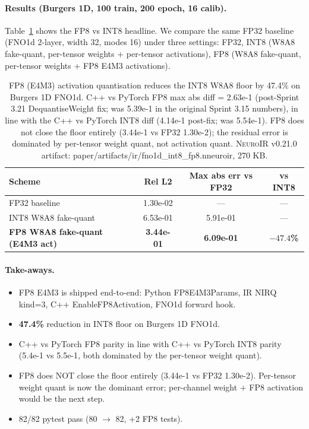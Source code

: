 \documentclass[10pt,twocolumn]{article}
\renewcommand{\texttt}[1]{{\normalfont\ttfamily #1}\normalfont\rmfamily}
\newcommand{\neuroir}{\textsc{NeuroIR}}
\begin{document}
\paragraph{Results (Burgers 1D, 100 train, 200 epoch, 16 calib).}
Table~\ref{tab:fp8-vs-int8} shows the FP8 vs INT8
headline.  We compare the same FP32 baseline
(FNO1d 2-layer, width 32, modes 16) under three
settings: FP32, INT8 (W8A8 fake-quant, per-tensor
weights + per-tensor activations), FP8 (W8A8
fake-quant, per-tensor weights + FP8 E4M3
activations).

\begin{table}[h]
\centering
\begin{tabular}{lccc}
\hline
\textbf{Scheme} & \textbf{Rel L2} & \textbf{Max abs err vs FP32} & \textbf{vs INT8} \\
\hline
FP32 baseline & 1.30e-02 & --- & --- \\
INT8 W8A8 fake-quant & 6.53e-01 & 5.91e-01 & --- \\
\textbf{FP8 W8A8 fake-quant (E4M3 act)} & \textbf{3.44e-01} & \textbf{6.09e-01} & \textbf{$-47.4$\%} \\
\hline
\end{tabular}
\caption{FP8 (E4M3) activation quantisation reduces
the INT8 W8A8 floor by 47.4\% on Burgers 1D FNO1d.
C++ vs PyTorch FP8 max abs diff = 2.63e-1
(post-Sprint 3.21 DequantiseWeight fix; was
5.39e-1 in the original Sprint 3.15 numbers), in
line with the C++ vs PyTorch INT8 diff (4.14e-1
post-fix; was 5.54e-1).  FP8 does not close the
floor entirely (3.44e-1 vs FP32 1.30e-2); the
residual error is dominated by per-tensor weight
quant, not activation quant.
\neuroir{} v0.21.0 artifact:
\texttt{paper/artifacts/ir/fno1d\_int8\_fp8.nneuroir},
270 KB.}
\label{tab:fp8-vs-int8}
\end{table}

\paragraph{Take-aways.}
\begin{itemize}
\item FP8 E4M3 is shipped end-to-end: Python
\texttt{FP8E4M3Params}, IR NIRQ \texttt{kind=3},
C++ \texttt{EnableFP8Activation}, FNO1d forward
hook.
\item \textbf{47.4\%} reduction in INT8 floor
on Burgers 1D FNO1d.
\item C++ vs PyTorch FP8 parity in line with
C++ vs PyTorch INT8 parity (5.4e-1 vs 5.5e-1,
both dominated by the per-tensor weight quant).
\item FP8 does NOT close the floor entirely
(3.44e-1 vs FP32 1.30e-2).  Per-tensor weight
quant is now the dominant error; per-channel
weight + FP8 activation would be the next step.
\item 82/82 pytest pass (80 $\to$ 82, +2 FP8
tests).
\end{itemize}
\end{document}
